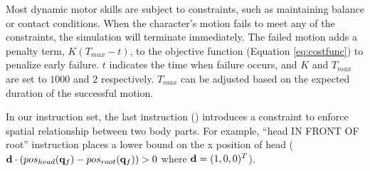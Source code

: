  



Most dynamic motor skills are subject to constraints, such as maintaining
balance or contact conditions.  When the character's motion fails to
meet any of the constraints, the simulation will terminate
immediately. The failed motion adds a penalty term, $K (T_{max} - t)
$, to the objective function (Equation \ref{eq:costfunc}) to penalize early
failure. $t$ indicates the time when failure occurs, and $K$ and
$T_{max}$ are set to $1000$ and $2$ respectively. $T_{max}$ can be
adjusted based on the expected duration of the successful motion.

In our instruction set, the last instruction ()
introduces a constraint to enforce spatial relationship between two
body parts. For example, ``head IN FRONT OF root'' instruction places a lower bound 
on the x position of head
($\mathbf{d} \cdot (pos_{head}(\mathbf{q}_f) - pos_{root}(\mathbf{q}_f)) > 0$ where $\mathbf{d}=(1,0,0)^T$).

